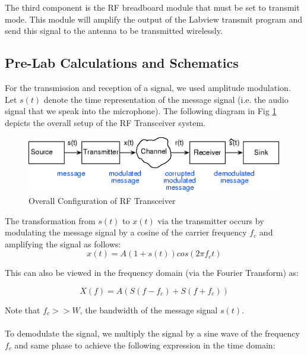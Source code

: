 \documentclass[10pt]{article}
\begin{document}
The third component is the RF breadboard module that must be set to transmit mode. This module will amplify the output of the Labview transmit program and send this signal to the antenna to be transmitted wirelessly. 


\medskip


\subsection{Pre-Lab Calculations and Schematics}
For the transmission and reception of a signal, we used amplitude modulation. Let $s(t)$ denote the time representation of the message signal (i.e. the audio signal that we speak into the microphone). The following diagram in Fig \ref{fig:amdiagram} depicts the overall setup of the RF Transceiver system. 

\begin{center}
	\begin{figure}[H]
		\centering
		\includegraphics[scale = 0.8]{images/amdiagram.png}
		\caption{Overall Configuration of RF Transceiver}
		\label{fig:amdiagram}
	\end{figure}
\end{center}
\noindent
The transformation from $s(t)$ to $x(t)$ via the transmitter occurs by modulating the message signal by a cosine of the carrier frequency $f_c$ and amplifying the signal as follows: 
$$ x(t) = A(1 + s(t))cos(2  \pi  f_c  t)$$

\noindent
This can also be viewed in the frequency domain (via the Fourier Transform) as:

$$ X(f) = A(S(f-f_c) + S(f+f_c))$$

\noindent
Note that $f_c >> W$, the bandwidth of the message signal $s(t)$. \\\\

To demodulate the signal, we multiply the signal by a sine wave of the frequency $f_c$ and same phase to achieve the following expression in the time domain: 
\end{document}
